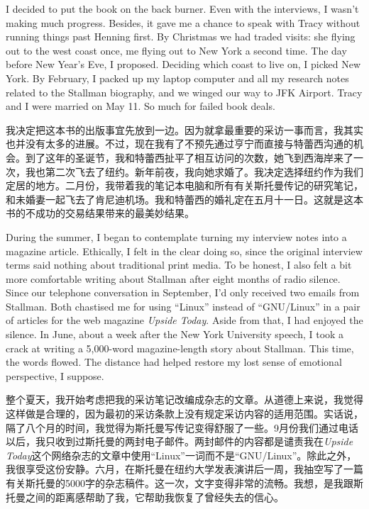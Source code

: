 \ifdefined\eng
I decided to put the book on the back burner. Even with the interviews, I wasn't making much progress. Besides, it gave me a chance to speak with Tracy without running things past Henning first. By Christmas we had traded visits: she flying out to the west coast once, me flying out to New York a second time. The day before New Year's Eve, I proposed. Deciding which coast to live on, I picked New York. By February, I packed up my laptop computer and all my research notes related to the Stallman biography, and we winged our way to JFK Airport. Tracy and I were married on May 11. So much for failed book deals.
\fi

\ifdefined\chs
我决定把这本书的出版事宜先放到一边。因为就拿最重要的采访一事而言，我其实也并没有太多的进展。不过，现在我有了不预先通过亨宁而直接与特蕾西沟通的机会。到了这年的圣诞节，我和特蕾西扯平了相互访问的次数，她飞到西海岸来了一次，我也第二次飞去了纽约。新年前夜，我向她求婚了。我决定选择纽约作为我们定居的地方。二月份，我带着我的笔记本电脑和所有有关斯托曼传记的研究笔记，和未婚妻一起飞去了肯尼迪机场。我和特蕾西的婚礼定在五月十一日。这就是这本书的不成功的交易结果带来的最美妙结果。
\fi

\ifdefined\eng
During the summer, I began to contemplate turning my interview notes into a magazine article. Ethically, I felt in the clear doing so, since the original interview terms said nothing about traditional print media. To be honest, I also felt a bit more comfortable writing about Stallman after eight months of radio silence. Since our telephone conversation in September, I'd only received two emails from Stallman. Both chastised me for using ``Linux'' instead of ``GNU/Linux'' in a pair of articles for the web magazine \textit{Upside Today}. Aside from that, I had enjoyed the silence. In June, about a week after the New York University speech, I took a crack at writing a 5,000-word magazine-length story about Stallman. This time, the words flowed. The distance had helped restore my lost sense of emotional perspective, I suppose.
\fi

\ifdefined\chs
整个夏天，我开始考虑把我的采访笔记改编成杂志的文章。从道德上来说，我觉得这样做是合理的，因为最初的采访条款上没有规定采访内容的适用范围。实话说，隔了八个月的时间，我觉得为斯托曼写传记变得舒服了一些。9月份我们通过电话以后，我只收到过斯托曼的两封电子邮件。两封邮件的内容都是谴责我在\textit{Upside Today}这个网络杂志的文章中使用``Linux''一词而不是``GNU/Linux''。除此之外，我很享受这份安静。六月，在斯托曼在纽约大学发表演讲后一周，我抽空写了一篇有关斯托曼的5000字的杂志稿件。这一次，文字变得非常的流畅。我想，是我跟斯托曼之间的距离感帮助了我，它帮助我恢复了曾经失去的信心。
\fi

